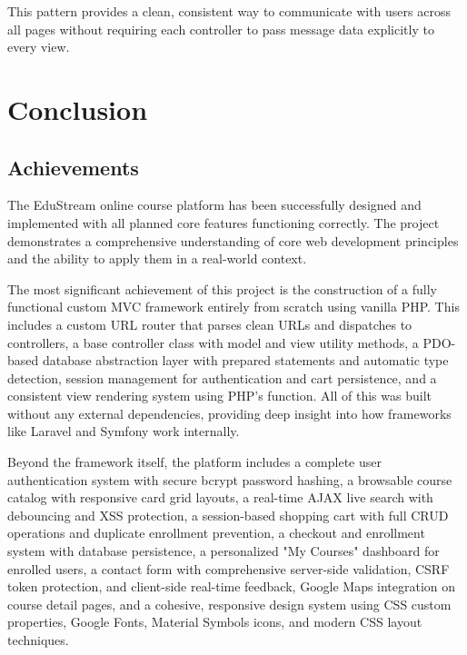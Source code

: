 \documentclass[12pt,a4paper]{report}
\begin{document}
This pattern provides a clean, consistent way to communicate with users across all pages without requiring each controller to pass message data explicitly to every view.

\newpage

\chapter{Conclusion}

\section{Achievements}

The EduStream online course platform has been successfully designed and implemented with all planned core features functioning correctly. The project demonstrates a comprehensive understanding of core web development principles and the ability to apply them in a real-world context.

The most significant achievement of this project is the construction of a fully functional custom MVC framework entirely from scratch using vanilla PHP. This includes a custom URL router that parses clean URLs and dispatches to controllers, a base controller class with model and view utility methods, a PDO-based database abstraction layer with prepared statements and automatic type detection, session management for authentication and cart persistence, and a consistent view rendering system using PHP's  function. All of this was built without any external dependencies, providing deep insight into how frameworks like Laravel and Symfony work internally.

Beyond the framework itself, the platform includes a complete user authentication system with secure bcrypt password hashing, a browsable course catalog with responsive card grid layouts, a real-time AJAX live search with debouncing and XSS protection, a session-based shopping cart with full CRUD operations and duplicate enrollment prevention, a checkout and enrollment system with database persistence, a personalized "My Courses" dashboard for enrolled users, a contact form with comprehensive server-side validation, CSRF token protection, and client-side real-time feedback, Google Maps integration on course detail pages, and a cohesive, responsive design system using CSS custom properties, Google Fonts, Material Symbols icons, and modern CSS layout techniques.
\end{document}
